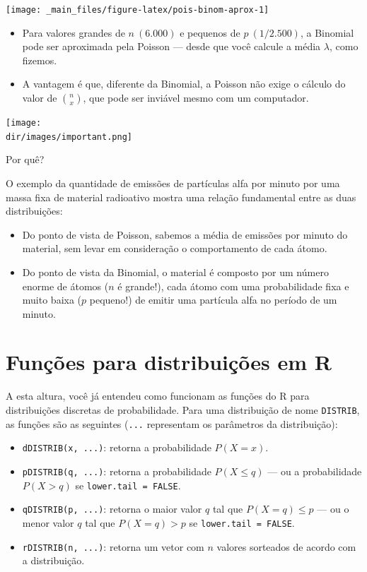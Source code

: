 \documentclass[
  11pt]{report}
\newcommand{\dir}{/ssd/R/x86_64-pc-linux-gnu-library/4.3/fnaufelRmd/rmarkdown/resources}
\newenvironment{rmdimportant}
{
  \begin{myimportant}
    \texttt{[image: \\dir/images/important.png]}
    \tcblower
  }
  {
  \end{myimportant}
}
\begin{document}
\begin{center}\texttt{[image: \_main\_files/figure-latex/pois-binom-aprox-1]} \end{center}

\begin{itemize}
\item
  Para valores grandes de $n~(6.000)$ e pequenos de $p~(1/2.500)$, a Binomial pode ser aproximada pela Poisson --- desde que você calcule a média $\lambda$, como fizemos.
\item
  A vantagem é que, diferente da Binomial, a Poisson não exige o cálculo do valor de $n \choose x$, que pode ser inviável mesmo com um computador.
\end{itemize}

\begin{rmdimportant}

Por quê?

O exemplo da quantidade de emissões de partículas alfa por minuto por uma massa fixa de material radioativo mostra uma relação fundamental entre as duas distribuições:

\begin{itemize}
\item
  Do ponto de vista de Poisson, sabemos a média de emissões por minuto do material, sem levar em consideração o comportamento de cada átomo.
\item
  Do ponto de vista da Binomial, o material é composto por um número enorme de átomos ($n$ é grande!), cada átomo com uma probabilidade fixa e muito baixa ($p$ pequeno!) de emitir uma partícula alfa no período de um minuto.
\end{itemize}

\end{rmdimportant}

\hypertarget{funuxe7uxf5es-para-distribuiuxe7uxf5es-em-r}{%
\section{Funções para distribuições em R}\label{funuxe7uxf5es-para-distribuiuxe7uxf5es-em-r}}

A esta altura, você já entendeu como funcionam as funções do R para distribuições discretas de probabilidade. Para uma distribuição de nome \texttt{DISTRIB}, as funções são as seguintes (\texttt{...} representam os parâmetros da distribuição):

\begin{itemize}
\item
  \texttt{dDISTRIB(x,\ ...)}: retorna a probabilidade $P(X = x)$.
\item
  \texttt{pDISTRIB(q,\ ...)}: retorna a probabilidade $P(X \leq q)$ --- ou a probabilidade $P(X > q)$ se \texttt{lower.tail\ =\ FALSE}.
\item
  \texttt{qDISTRIB(p,\ ...)}: retorna o maior valor $q$ tal que $P(X = q) \leq p$ --- ou o menor valor $q$ tal que $P(X = q) > p$ se \texttt{lower.tail\ =\ FALSE}.
\item
  \texttt{rDISTRIB(n,\ ...)}: retorna um vetor com $n$ valores sorteados de acordo com a distribuição.
\end{itemize}
\end{document}
